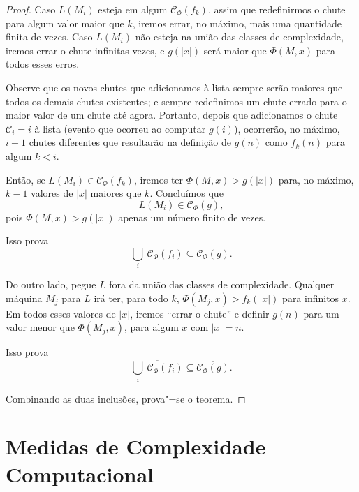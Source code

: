 \begin{proof}
    Caso $L(M_i)$ esteja em algum $\mathcal C_\Phi(f_k)$,
    assim que redefinirmos o chute para algum valor maior que $k$,
    iremos errar, no máximo,
    mais uma quantidade finita de vezes.
    Caso $L(M_i)$ não esteja na união das classes de complexidade,
    iremos errar o chute infinitas vezes,
    e $g(|x|)$ será maior que $\Phi(M, x)$ para todos esses erros.

    Observe que os novos chutes que adicionamos à lista
    sempre serão maiores que todos os demais chutes existentes;
    e sempre redefinimos um chute errado
    para o maior valor de um chute até agora.
    Portanto, depois que adicionamos o chute
    $\mathcal C_i = i$ à lista
    (evento que ocorreu ao computar $g(i)$),
    ocorrerão, no máximo,
    $i-1$ chutes diferentes
    que resultarão na definição de $g(n)$ como $f_k(n)$
    para algum $k < i$.

    Então, se $L(M_i) \in \mathcal C_\Phi(f_k)$,
    iremos ter $\Phi(M, x) > g(|x|)$
    para, no máximo, $k-1$ valores de $|x|$ maiores que $k$.
    Concluímos que
    \begin{equation*}
        L(M_i) \in \mathcal C_\Phi(g),
    \end{equation*}
    pois $\Phi(M, x) > g(|x|)$ apenas um número finito de vezes.

    Isso prova
    \begin{equation*}
        \bigcup_i \ \mathcal C_\Phi(f_i) \subseteq \mathcal C_\Phi(g).
    \end{equation*}

    Do outro lado,
    pegue $L$ fora da união das classes de complexidade.
    Qualquer máquina $M_j$ para $L$
    irá ter, para todo $k$,
    $\Phi(M_j, x) > f_k(|x|)$ para infinitos $x$.
    Em todos esses valores de $|x|$,
    iremos ``errar o chute''
    e definir $g(n)$
    para um valor menor que $\Phi(M_j, x)$,
    para algum $x$ com $|x| = n$.

    Isso prova
    \begin{equation*}
        \overline{\bigcup_i \ \mathcal C_\Phi(f_i)}
        \subseteq \overline{\mathcal C_\Phi(g)}.
    \end{equation*}

    Combinando as duas inclusões, prova"=se o teorema.
\end{proof}

\section{Medidas de Complexidade Computacional}
\label{medidas_padrao}

